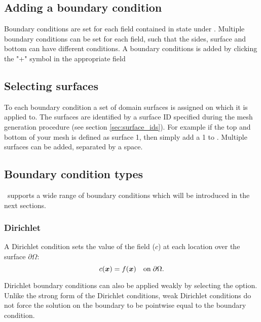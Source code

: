 \subsection{Adding a boundary condition}\label{sec:BCs:adding}

Boundary conditions are set for each field contained in state under . 
Multiple boundary conditions can be set for each field, such that the sides, surface and bottom can 
have different conditions. A boundary conditions is added by clicking the "+" symbol
in the appropriate field

\subsection{Selecting surfaces}\label{sec:BCs:selecting}
To each boundary condition a set of domain surfaces is assigned on which it is applied to. The surfaces are identified by a surface ID specified during the mesh generation procedure (see section \ref{sec:surface_ids}). For example if the top and bottom of your mesh is defined as surface
1, then simply add a 1 to . Multiple surfaces 
can be added, separated by a space.

\subsection{Boundary condition types}\label{sec:BCs:types}
\fluidity\ supports a wide range of boundary conditions which will be introduced in the next sections.

\subsubsection{Dirichlet}

A Dirichlet condition sets the value of the field ($c$) at each location over the surface $\partial\Omega$:
\begin{equation*}
c({\mbox{\boldmath$x$}}) = f({\mbox{\boldmath$x$}}) \quad \textrm{on}\; \partial\Omega.
\end{equation*}

Dirichlet boundary conditions can also be applied weakly by selecting the 
option. Unlike the strong form of the Dirichlet conditions, weak Dirichlet
conditions do not force the solution on the boundary to be pointwise equal
to the boundary condition. 

